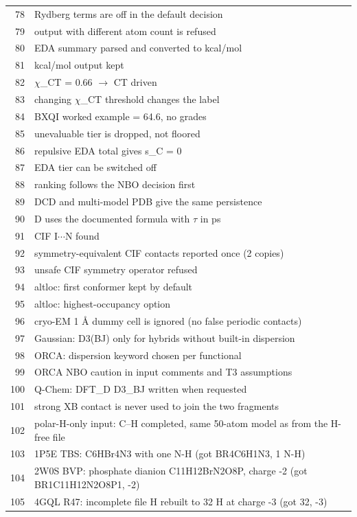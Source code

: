{\begin{longtable}{rp{14.5cm}}
78 & Rydberg terms are off in the default decision\\
79 & output with different atom count is refused\\
80 & EDA summary parsed and converted to kcal/mol\\
81 & kcal/mol output kept\\
82 & $\chi$\_CT = 0.66 $\to$ CT driven\\
83 & changing $\chi$\_CT threshold changes the label\\
84 & BXQI worked example = 64.6, no grades\\
85 & unevaluable tier is dropped, not floored\\
86 & repulsive EDA total gives s\_C = 0\\
87 & EDA tier can be switched off\\
88 & ranking follows the NBO decision first\\
89 & DCD and multi-model PDB give the same persistence\\
90 & D uses the documented formula with $\tau$ in ps\\
91 & CIF I$\cdots$N found\\
92 & symmetry-equivalent CIF contacts reported once (2 copies)\\
93 & unsafe CIF symmetry operator refused\\
94 & altloc: first conformer kept by default\\
95 & altloc: highest-occupancy option\\
96 & cryo-EM 1 \AA{} dummy cell is ignored (no false periodic contacts)\\
97 & Gaussian: D3(BJ) only for hybrids without built-in dispersion\\
98 & ORCA: dispersion keyword chosen per functional\\
99 & ORCA NBO caution in input comments and T3 assumptions\\
100 & Q-Chem: DFT\_D D3\_BJ written when requested\\
101 & strong XB contact is never used to join the two fragments\\
102 & polar-H-only input: C--H completed, same 50-atom model as from the H-free file\\
103 & 1P5E TBS: C6HBr4N3 with one N-H (got BR4C6H1N3, 1 N-H)\\
104 & 2W0S BVP: phosphate dianion C11H12BrN2O8P, charge -2 (got BR1C11H12N2O8P1, -2)\\
105 & 4GQL R47: incomplete file H rebuilt to 32 H at charge -3 (got 32, -3)\\

\end{longtable}}
